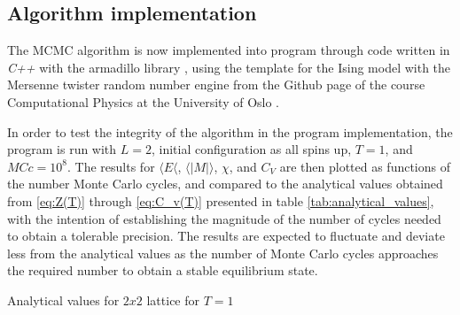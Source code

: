 \documentclass[%
oneside,                 %
final,                   %
10pt]{article}
\begin{document}
\subsection{Algorithm implementation}
\label{SS:init.algo.impl}	
The MCMC algorithm is now implemented into program through code written in \textit{C++} with the armadillo library \cite{armadillo}, using the template for the Ising model with the Mersenne twister random number engine from the Github page of the course Computational Physics at the University of Oslo \cite{CPgithub}. \newline

In order to test the integrity of the algorithm in the program implementation, the program is run with $L=2$, initial configuration as all spins up, $T=1$, and $MCc=10^8$. The results for $\langle E \langle$, $\langle |M| \rangle$, $\chi$, and $C_V$ are then plotted as functions of the number Monte Carlo cycles, and compared to the analytical values obtained from \eqref{eq:Z(T)} through \eqref{eq:C_v(T)} presented in table \ref{tab:analytical_values}, with the intention of establishing the magnitude of the number of cycles needed to obtain a tolerable precision. The results are expected to fluctuate and deviate less from the analytical values as the number of Monte Carlo cycles approaches the required number to obtain a stable equilibrium state.\newline



\begin{table}[h!tb]
    \centering
    \caption{Analytical values for $2x2$ lattice for $T=1$}
\label{tab:analytical_values}
\end{table}
 
\end{document}
